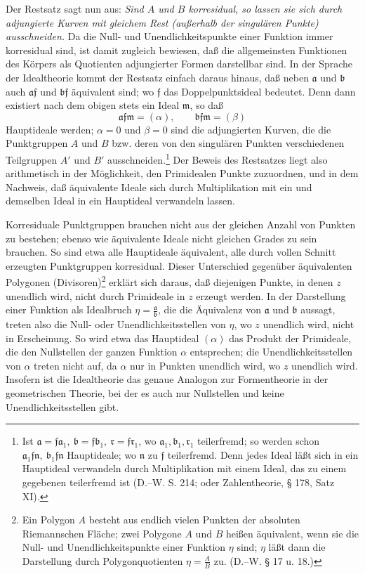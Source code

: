 \documentclass[11pt]{article}
\providecommand{\fra}{\mathfrak a}
\providecommand{\frb}{\mathfrak b}
\providecommand{\frf}{\mathfrak f}
\providecommand{\frr}{\mathfrak r}
\providecommand{\frm}{\mathfrak m}
\begin{document}
Der Restsatz sagt nun aus: \emph{Sind \(A\) und \(B\) korresidual, so lassen sie sich durch adjungierte Kurven mit gleichem Rest (außerhalb der singulären Punkte) ausschneiden.} Da die Null- und Unendlichkeitspunkte einer Funktion immer korresidual sind, ist damit zugleich bewiesen, daß die allgemeinsten Funktionen des Körpers als Quotienten adjungierter Formen darstellbar sind. In der Sprache der Idealtheorie kommt der Restsatz einfach daraus hinaus, daß neben \(\fra\) und \(\frb\) auch \(\fra\frf\) und \(\frb\frf\) äquivalent sind; wo \(\frf\) das Doppelpunktsideal bedeutet. Denn dann existiert nach dem obigen stets ein Ideal \(\frm\), so daß
\[
\fra\frf\frm=(\alpha),\qquad \frb\frf\frm=(\beta)
\]
Hauptideale werden; \(\alpha=0\) und \(\beta=0\) sind die adjungierten Kurven, die die Punktgruppen \(A\) und \(B\) bzw. deren von den singulären Punkten verschiedenen Teilgruppen \(A'\) und \(B'\) ausschneiden.\footnote{Ist \(\fra=\frf\fra_1,\ \frb=\frf\frb_1,\ \frr=\frf\frr_1\), wo \(\fra_1,\frb_1,\frr_1\) teilerfremd; so werden schon \(\fra_1\frf\mathfrak n,\ \frb_1\frf\mathfrak n\) Hauptideale; wo \(\mathfrak n\) zu \(\frf\) teilerfremd. Denn jedes Ideal läßt sich in ein Hauptideal verwandeln durch Multiplikation mit einem Ideal, das zu einem gegebenen teilerfremd ist (D.--W. S. 214; oder Zahlentheorie, § 178, Satz XI).} Der Beweis des Restsatzes liegt also arithmetisch in der Möglichkeit, den Primidealen Punkte zuzuordnen, und in dem Nachweis, daß äquivalente Ideale sich durch Multiplikation mit ein und demselben Ideal in ein Hauptideal verwandeln lassen.

Korresiduale Punktgruppen brauchen nicht aus der gleichen Anzahl von Punkten zu bestehen; ebenso wie äquivalente Ideale nicht gleichen Grades zu sein brauchen. So sind etwa alle Hauptideale äquivalent, alle durch vollen Schnitt erzeugten Punktgruppen korresidual. Dieser Unterschied gegenüber äquivalenten Polygonen (Divisoren)\footnote{Ein Polygon \(A\) besteht aus endlich vielen Punkten der absoluten Riemannschen Fläche; zwei Polygone \(A\) und \(B\) heißen äquivalent, wenn sie die Null- und Unendlichkeitspunkte einer Funktion \(\eta\) sind; \(\eta\) läßt dann die Darstellung durch Polygonquotienten \(\eta=\frac{A}{B}\) zu. (D.--W. § 17 u. 18.)} erklärt sich daraus, daß diejenigen Punkte, in denen \(z\) unendlich wird, nicht durch Primideale in \(z\) erzeugt werden. In der Darstellung einer Funktion als Idealbruch \(\eta=\frac{\fra}{\frb}\), die die Äquivalenz von \(\fra\) und \(\frb\) aussagt, treten also die Null- oder Unendlichkeitsstellen von \(\eta\), wo \(z\) unendlich wird, nicht in Erscheinung. So wird etwa das Hauptideal \((\alpha)\) das Produkt der Primideale, die den Nullstellen der ganzen Funktion \(\alpha\) entsprechen; die Unendlichkeitsstellen von \(\alpha\) treten nicht auf, da \(\alpha\) nur in Punkten unendlich wird, wo \(z\) unendlich wird. Insofern ist die Idealtheorie das genaue Analogon zur Formentheorie in der geometrischen Theorie, bei der es auch nur Nullstellen und keine Unendlichkeitsstellen gibt.
\end{document}
